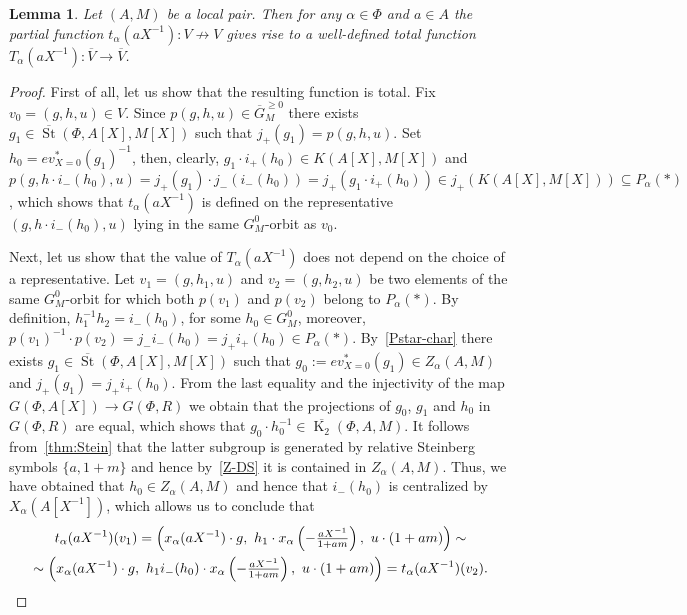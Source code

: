 \documentclass[oneside, 8pt]{amsart}
\newtheorem{lemma}{Lemma}
\theoremstyle{remark}
\theoremstyle{definition}
\numberwithin{lemma}{section}
\numberwithin{prop}{section}
\numberwithin{corollary}{section}
\numberwithin{externaltheorem}{section}
\DeclareMathOperator{\St}{St}
\DeclareMathOperator{\K}{K}
\numberwithin{equation}{section}
\begin{document}
\begin{lemma}\label{lem:orbit-action} Let $(A, M)$ be a local pair. 
Then for any $\alpha \in \Phi$ and $a \in A$ the partial function $t_\alpha(aX^{-1}) \colon V \not \to V$ gives rise to a well-defined total function $T_\alpha(aX^{-1}) \colon \overline{V} \to \overline{V}$. \end{lemma}
\begin{proof}
 First of all, let us show that the resulting function is total. 
 Fix $v_0 = (g, h, u) \in V$. Since $p(g, h, u) \in \overline{G}^{\geq 0}_M$ there exists $g_1 \in \overline{\St}(\Phi, A[X], M[X])$ such that $j_+(g_1) = p(g, h, u).$
 Set $h_0 = ev^*_{X=0}(g_1)^{-1}$, then, clearly, $g_1 \cdot i_+(h_0) \in K(A[X], M[X])$ and 
 $p(g, h \cdot i_-(h_0), u) = j_+(g_1) \cdot j_-(i_-(h_0)) = j_+(g_1 \cdot i_+(h_0)) \in j_+(K(A[X], M[X])) \subseteq P_\alpha(*)$, which shows that $t_\alpha(aX^{-1})$ is defined on the representative $(g, h \cdot i_-(h_0), u)$ lying in the same $G_M^0$-orbit as $v_0$.
  
 Next, let us show that the value of $T_\alpha(aX^{-1})$ does not depend on the choice of a representative.
 Let $v_1 = (g, h_1, u)$ and $v_2 = (g, h_2, u)$ be two elements of the same $G_M^0$-orbit for which both $p(v_1)$ and $p(v_2)$ belong to $P_\alpha(*)$.
 By definition, $h_1^{-1} h_2 = i_-(h_0)$, for some $h_0 \in G^0_M$, moreover, 
  $p(v_1)^{-1} \cdot p(v_2) = j_- i_-(h_0) = j_+ i_+(h_0) \in P_\alpha(*)$.
 By~\cref{Pstar-char} there exists $g_1 \in \overline{\St}(\Phi, A[X], M[X])$ such that $g_0 := ev^*_{X=0}(g_1) \in Z_\alpha(A, M)$ and $j_+(g_1) = j_+ i_+ (h_0)$.
 From the last equality and the injectivity of the map $G(\Phi, A[X]) \to G(\Phi, R)$ we obtain that the projections of $g_0$, $g_1$ and $h_0$ in $G(\Phi, R)$ are equal, which shows that $g_0 \cdot h_0^{-1} \in \overline{\K_2}(\Phi, A, M)$. It follows from~\cref{thm:Stein} that the latter subgroup is generated by relative Steinberg symbols $\{ a, 1 + m \}$ and hence by~\cref{Z-DS} it is contained in $Z_\alpha(A, M)$. Thus, we have obtained that $h_0 \in Z_\alpha(A, M)$ and hence that $i_-(h_0)$ is centralized by $X_\alpha(A[X^{-1}])$, which allows us to conclude that
 \begin{multline} \nonumber
  t_\alpha(aX^{-1})(v_1) = \left( x_\alpha(aX^{-1})\cdot g ,\ h_1 \cdot x_\alpha\left(-\tfrac{aX^{-1}}{1 + am}\right),\ u \cdot (1 + am)\right) \sim \\
  \sim \left( x_\alpha(aX^{-1})\cdot g ,\ h_1 i_-(h_0) \cdot x_\alpha\left(-\tfrac{aX^{-1}}{1 + am}\right),\ u \cdot (1 + am)\right) = t_\alpha(aX^{-1})(v_2). \qedhere
 \end{multline} \end{proof}
\end{document}
